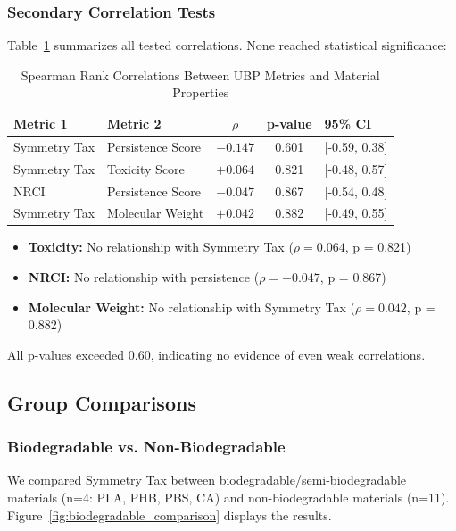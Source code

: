 \documentclass[11pt,letterpaper]{article}
\begin{document}
\subsubsection{Secondary Correlation Tests}
Table~\ref{tab:correlations} summarizes all tested correlations. None reached statistical significance:

\begin{table}[h!]
\centering
\caption{Spearman Rank Correlations Between UBP Metrics and Material Properties}
\label{tab:correlations}
\begin{tabular}{llccp{4cm}}
\toprule
\textbf{Metric 1} & \textbf{Metric 2} & \textbf{$\rho$} & \textbf{p-value} & \textbf{95\% CI} \\
\midrule
Symmetry Tax & Persistence Score & $-0.147$ & 0.601 & [-0.59, 0.38] \\
Symmetry Tax & Toxicity Score & $+0.064$ & 0.821 & [-0.48, 0.57] \\
NRCI & Persistence Score & $-0.047$ & 0.867 & [-0.54, 0.48] \\
Symmetry Tax & Molecular Weight & $+0.042$ & 0.882 & [-0.49, 0.55] \\
\bottomrule
\end{tabular}
\end{table}

\begin{itemize}
    \item \textbf{Toxicity:} No relationship with Symmetry Tax ($\rho = 0.064$, p = 0.821)
    \item \textbf{NRCI:} No relationship with persistence ($\rho = -0.047$, p = 0.867)
    \item \textbf{Molecular Weight:} No relationship with Symmetry Tax ($\rho = 0.042$, p = 0.882)
\end{itemize}

All p-values exceeded 0.60, indicating no evidence of even weak correlations.

\subsection{Group Comparisons}
\label{sec:group_comparisons}

\subsubsection{Biodegradable vs. Non-Biodegradable}
We compared Symmetry Tax between biodegradable/semi-biodegradable materials (n=4: PLA, PHB, PBS, CA) and non-biodegradable materials (n=11). Figure~\ref{fig:biodegradable_comparison} displays the results.
\end{document}
